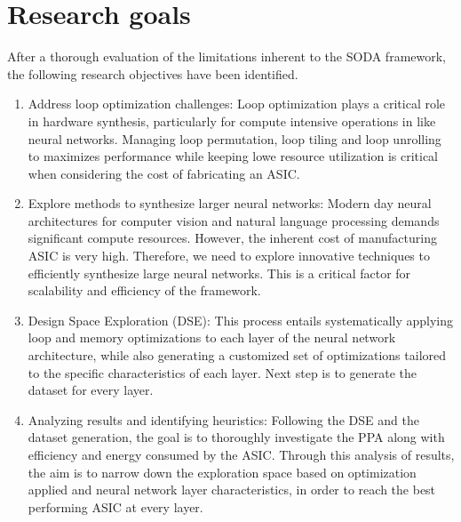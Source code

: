 \section{Research goals}

After a thorough evaluation of the limitations inherent to the SODA framework, the following research objectives have been identified.

\begin{enumerate}
    
    \item Address loop optimization challenges: Loop optimization plays a critical role in hardware synthesis, particularly for compute intensive operations in like neural networks. Managing loop permutation, loop tiling and loop unrolling to maximizes performance while keeping lowe resource utilization is critical when considering the cost of fabricating an ASIC.

    \item Explore methods to synthesize larger neural networks: Modern day neural architectures for computer vision and natural language processing demands significant compute resources. However, the inherent cost of manufacturing ASIC is very high. Therefore, we need to explore innovative techniques to efficiently synthesize large neural networks. This is a critical factor for scalability and efficiency of the framework.
    
    \item Design Space Exploration (DSE): This process entails systematically applying loop and memory optimizations to each layer of the neural network architecture, while also generating a customized set of optimizations tailored to the specific characteristics of each layer. Next step is to  generate the dataset for every layer.

    \item Analyzing results and identifying heuristics: Following the DSE and the dataset generation, the goal is to thoroughly investigate the PPA along with efficiency and energy consumed by the ASIC. Through this analysis of results, the aim is to narrow down the exploration space based on optimization applied and neural network layer characteristics, in order to reach the best performing ASIC at every layer.
    
\end{enumerate}

